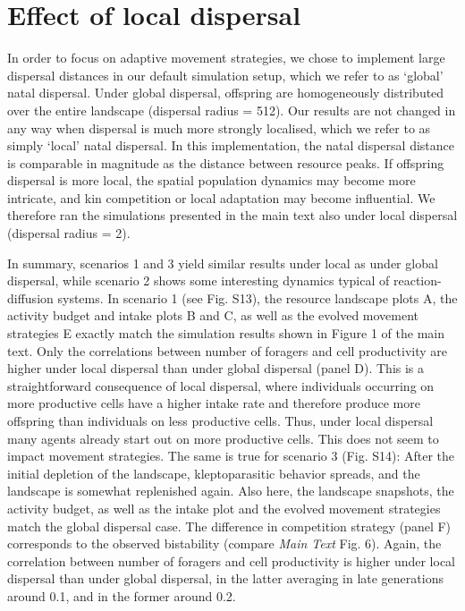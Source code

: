 \documentclass[]{article}
\begin{document}
\newpage

\hypertarget{effect-of-local-dispersal}{%
\section{Effect of local dispersal}\label{effect-of-local-dispersal}}

In order to focus on adaptive movement strategies, we chose to implement large dispersal distances in our default simulation setup, which we refer to as `global' natal dispersal.
Under global dispersal, offspring are homogeneously distributed over the entire landscape (dispersal radius = 512).
Our results are not changed in any way when dispersal is much more strongly localised, which we refer to as simply `local' natal dispersal.
In this implementation, the natal dispersal distance is comparable in magnitude as the distance between resource peaks.
If offspring dispersal is more local, the spatial population dynamics may become more intricate, and kin competition or local adaptation may become influential. We therefore ran the simulations presented in the main text also under local dispersal (dispersal radius = 2).

In summary, scenarios 1 and 3 yield similar results under local as under global dispersal, while scenario 2 shows some interesting dynamics typical of reaction-diffusion systems.
In scenario 1 (see Fig. S13), the resource landscape plots A, the activity budget and intake plots B and C, as well as the evolved movement strategies E exactly match the simulation results shown in Figure 1 of the main text. Only the correlations between number of foragers and cell productivity are higher under local dispersal than under global dispersal (panel D).
This is a straightforward consequence of local dispersal, where individuals occurring on more productive cells have a higher intake rate and therefore produce more offspring than individuals on less productive cells. Thus, under local dispersal many agents already start out on more productive cells. This does not seem to impact movement strategies.
The same is true for scenario 3 (Fig. S14): After the initial depletion of the landscape, kleptoparasitic behavior spreads, and the landscape is somewhat replenished again. Also here, the landscape snapshots, the activity budget, as well as the intake plot and the evolved movement strategies match the global dispersal case. The difference in competition strategy (panel F) corresponds to the observed bistability (compare \emph{Main Text} Fig. 6). Again, the correlation between number of foragers and cell productivity is higher under local dispersal than under global dispersal, in the latter averaging in late generations around 0.1, and in the former around 0.2.
\end{document}
